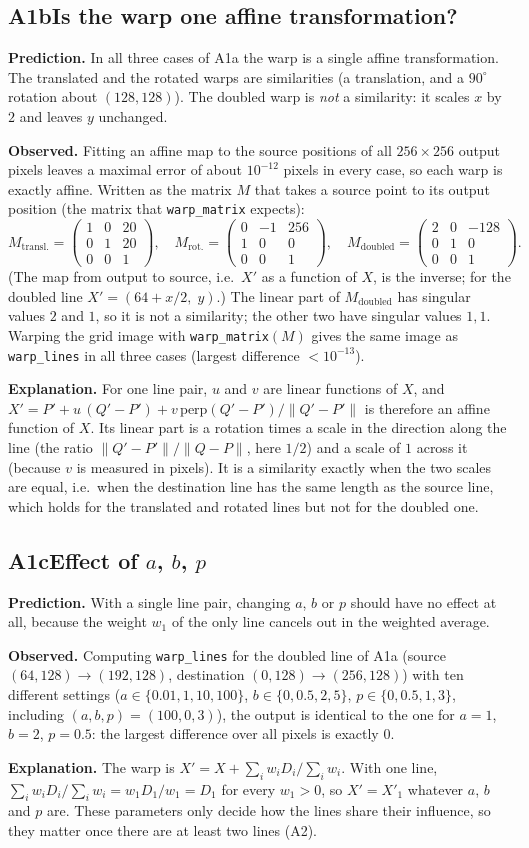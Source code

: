 \documentclass[10pt,a4paper]{article}
\newcommand{\experiment}[5]{%
  \subsection*{#1\quad #2}
  \textbf{Prediction.} #3\par
  \textbf{Observed.} #4\par
  \textbf{Explanation.} #5\par
}
\begin{document}
\experiment{A1b}{Is the warp one affine transformation?}
  {In all three cases of A1a the warp is a single affine transformation. The translated and the rotated
   warps are similarities (a translation, and a $90^\circ$ rotation about $(128,128)$). The doubled warp is
   \emph{not} a similarity: it scales $x$ by $2$ and leaves $y$ unchanged.}
  {Fitting an affine map to the source positions of all $256\times256$ output pixels leaves a maximal error
   of about $10^{-12}$ pixels in every case, so each warp is exactly affine. Written as the matrix $M$ that
   takes a source point to its output position (the matrix that \texttt{warp\_matrix} expects):
   \[
   M_{\text{transl.}}=\begin{pmatrix}1&0&20\\0&1&20\\0&0&1\end{pmatrix},\quad
   M_{\text{rot.}}=\begin{pmatrix}0&-1&256\\1&0&0\\0&0&1\end{pmatrix},\quad
   M_{\text{doubled}}=\begin{pmatrix}2&0&-128\\0&1&0\\0&0&1\end{pmatrix}.
   \]
   (The map from output to source, i.e.\ $X'$ as a function of $X$, is the inverse; for the doubled line
   $X'=(64+x/2,\;y)$.) The linear part of $M_{\text{doubled}}$ has singular values $2$ and $1$, so it is not a
   similarity; the other two have singular values $1,1$. Warping the grid image with
   \texttt{warp\_matrix}$(M)$ gives the same image as \texttt{warp\_lines} in all three cases (largest
   difference $<10^{-13}$).}
  {For one line pair, $u$ and $v$ are linear functions of $X$, and $X'=P'+u\,(Q'-P')+v\,\mathrm{perp}(Q'-P')/\|Q'-P'\|$
   is therefore an affine function of $X$. Its linear part is a rotation times a scale in the direction along
   the line (the ratio $\|Q'-P'\|/\|Q-P\|$, here $1/2$) and a scale of $1$ across it (because $v$ is measured in
   pixels). It is a similarity exactly when the two scales are equal, i.e.\ when the destination line has the
   same length as the source line, which holds for the translated and rotated lines but not for the doubled one.}

\experiment{A1c}{Effect of $a$, $b$, $p$}
  {With a single line pair, changing $a$, $b$ or $p$ should have no effect at all, because the weight $w_1$
   of the only line cancels out in the weighted average.}
  {Computing \texttt{warp\_lines} for the doubled line of A1a (source $(64,128)\to(192,128)$, destination
   $(0,128)\to(256,128)$) with ten different settings ($a\in\{0.01,1,10,100\}$, $b\in\{0,0.5,2,5\}$, $p\in\{0,0.5,1,3\}$, including
   $(a,b,p)=(100,0,3)$), the output is identical to the one for $a=1$, $b=2$, $p=0.5$: the largest difference
   over all pixels is exactly $0$.}
  {The warp is $X'=X+\sum_i w_iD_i/\sum_i w_i$. With one line, $\sum_i w_iD_i/\sum_i w_i=w_1D_1/w_1=D_1$ for
   every $w_1>0$, so $X'=X'_1$ whatever $a$, $b$ and $p$ are. These parameters only decide how the lines share
   their influence, so they matter once there are at least two lines (A2).}
\end{document}
